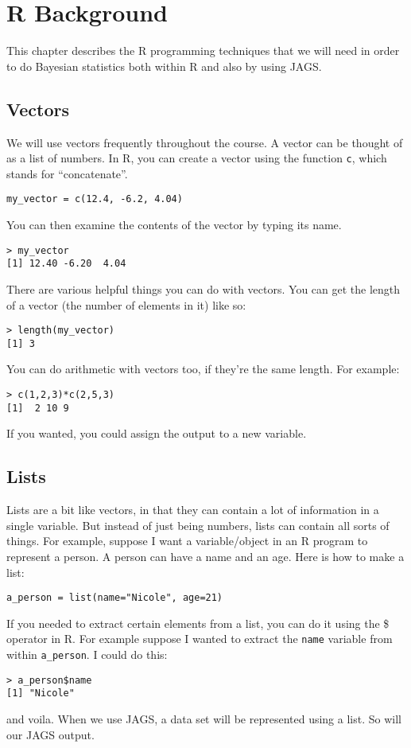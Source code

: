 \chapter{R Background}
This chapter describes the R programming techniques that we will need in order
to do Bayesian statistics both within R and also by using JAGS.

\section{Vectors}
We will use vectors frequently throughout the course. A vector can be thought
of as a list of numbers. In R, you can create a vector using the function
{\tt c}, which stands for ``concatenate''.
\begin{verbatim}
my_vector = c(12.4, -6.2, 4.04)
\end{verbatim}
You can then examine the contents of the vector by typing its name.
\begin{verbatim}
> my_vector
[1] 12.40 -6.20  4.04
\end{verbatim}
There are various helpful things you can do with vectors. You can get the length
of a vector (the number of elements in it) like so:
\begin{verbatim}
> length(my_vector)
[1] 3
\end{verbatim}
You can do arithmetic
with vectors too, if they're the same length. For example:
\begin{verbatim}
> c(1,2,3)*c(2,5,3)
[1]  2 10 9
\end{verbatim}
If you wanted, you could assign the output to a new variable.

\section{Lists}
Lists are a bit like vectors, in that they can contain a lot of information in
a single variable. But instead of just being numbers, lists can contain all
sorts of things. For example, suppose I want a variable/object in an R program
to represent a person. A person can have a name and an age. Here is how to make
a list:
\begin{verbatim}
a_person = list(name="Nicole", age=21)
\end{verbatim}
If you needed to extract certain elements from a list, you can do it using the
\$ operator in R. For example suppose I wanted to extract the {\tt name} variable
from within {\tt a\_person}. I could do this:
\begin{verbatim}
> a_person$name
[1] "Nicole"
\end{verbatim}
and voila. When we use JAGS, a data set will be represented using a list.
So will our JAGS output.


